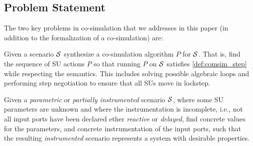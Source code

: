 
\subsection{Problem Statement}
The two key problems in co-simulation that we addresses in this paper (in addition to the formalization of a co-simulation) are:
\begin{compactenum}
  \item Given a scenario $\mathcal{S}$ synthesize a co-simulation algorithm $P$ for $\mathcal{S}$.
  That is, find the sequence of SU actions $P$ so that running $P$ on $\mathcal{S}$ satisfies \cref{def:comsim_step} while respecting the semantics.
  This includes solving possible algebraic loops and performing step negotiation to ensure that all SUs move in lockstep.
  \item Given a \emph{parametric} or \emph{partially instrumented} scenario $\mathcal{S}$, where some SU parameters are unknown and where the instrumentation is incomplete, i.e., not all input ports have been declared ether \emph{reactive} or \emph{delayed}, find concrete values for the parameters, and concrete instrumentation of the input ports, such that the resulting \emph{instrumented} scenario represents a system with desirable properties.
\end{compactenum}
